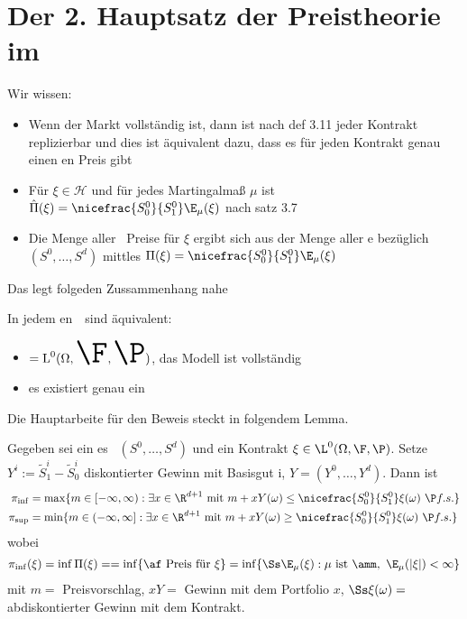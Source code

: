  	\section{Der 2. Hauptsatz der Preistheorie im \epm}
 	Wir wissen:
 	\begin{itemize}
 		\item Wenn der Markt vollständig ist, dann ist nach def 3.11 jeder Kontrakt replizierbar und dies ist äquivalent dazu, dass es für jeden Kontrakt genau einen \af en Preis gibt
 		\item Für $\xi\in\mathcal{H}$ und für jedes Martingalmaß $\mu$ ist $\hat{\Pi}(\xi)=\nicefrac{S_0^0}{S_1^0}\E_{\mu}(\xi)$ nach satz 3.7
 		\item Die Menge aller \af \ Preise für $\xi$ ergibt sich aus der Menge aller \amm e bezüglich $(S^0,…,S^d)$ mittles $\Pi(\xi)=\nicefrac{S_0^0}{S_1^0}\E_{\mu}(\xi)$
 	\end{itemize}
 	Das legt folgeden Zussammenhang nahe
 	\begin{satz}
 		In jedem \af en\ \epm\ sind äquivalent:
 		\begin{itemize}
 			\item $\Huge=\operatorname{L}^0(\Omega,\F,\P)$, das Modell ist vollständig
 			\item es existiert genau ein \amm
 		\end{itemize}
 	\end{satz}
 	Die Hauptarbeite für den Beweis steckt in folgendem Lemma.
 	\begin{lem}
 		Gegeben sei ein \af es \epm\ $(S^0,…,S^d)$ und ein Kontrakt $\xi\in\L^0(\Omega,\F,\P)$. Setze $Y^i:=\tilde{S}^i_1-\tilde S_0^i$ diskontierter Gewinn mit Basisgut i, $Y=(Y^0,…,Y^d)$. Dann ist 
 		\begin{align*}
 			\pi_{\operatorname{inf}}&=\operatorname{max}\{m\in [-\infty,\infty): \exists x \in \R^{d+1} \text{ mit }m+xY(\omega)\le\nicefrac{S^0_0}{S^0_1}\xi(\omega)\ \P f.s. \}\\
 			\pi_{\operatorname{sup}}&=\operatorname{min}\{m\in (-\infty,\infty]: \exists x \in \R^{d+1} \text{ mit }m+xY(\omega)\ge\nicefrac{S^0_0}{S^0_1}\xi(\omega)\ \P f.s. \}
 		\end{align*}
 		wobei
 		\begin{align*}
 			\pi_{\inf}(\xi)=\inf\Pi(\xi)==\inf\{\text{\af\ Preis für }\xi \}=\inf\{\Ss\E_{\mu}(\xi):\mu\text{ ist \amm},\ \E_{\mu}(|\xi|)<\infty \}
 		\end{align*}
 		mit $m=$ Preisvorschlag, $xY=$ Gewinn mit dem Portfolio $x$, $\Ss\xi(\omega)=$ abdiskontierter Gewinn mit dem Kontrakt.
 	\end{lem}
